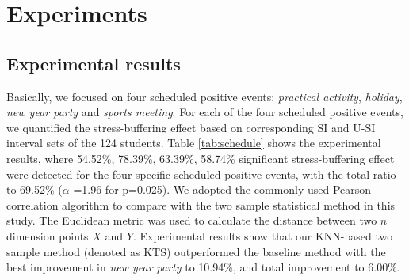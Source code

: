 \section{Experiments}
\subsection{Experimental results}
\label{subsec:experiment}
Basically, we focused on four scheduled positive events:
\emph{practical activity}, \emph{holiday}, \emph{new year party} and \emph{sports meeting}.
For each of the four scheduled positive events,
we quantified the stress-buffering effect based on corresponding SI and U-SI interval sets of the 124 students.
Table \ref{tab:schedule} shows the experimental results,
where 54.52\%, 78.39\%, 63.39\%, 58.74\% significant stress-buffering effect were detected for the four specific scheduled positive events,
with the total ratio to 69.52\% ($\alpha$ =1.96 for p=0.025).
We adopted the commonly used Pearson correlation algorithm to compare with the two sample statistical method in this study.
The Euclidean metric was used to calculate the distance between two $n$ dimension points $X$ and $Y$.
Experimental results show that our KNN-based two sample method (denoted as KTS) outperformed the baseline method
with the best improvement in \emph{new year party} to 10.94\%,
and total improvement to 6.00\%.

\begin{table}[H]
\begin{center}
\caption{\small{Quantify the impact of scheduled positive school events using KTS (the KNN-based two sample method adopted in this research) and baseline method.}}
\label{tab:schedule}
\end{center}
\end{table}


